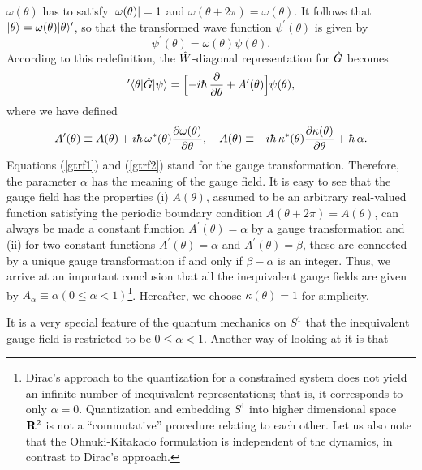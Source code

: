 \documentclass[a4paper,12pt]{article}
\begin{document}
$\omega(\theta)$ has to satisfy ${\left|{\omega(\theta)}\right|}=1$ 
and $\omega(\theta+2\pi)=\omega(\theta)$. It follows that    
$|{\theta}\rangle=\omega(\theta)|{\theta}\rangle^{\prime}$, so that the transformed
wave function $\psi^{\prime}(\theta)$ is given by
\begin{equation}
\psi^{\prime}(\theta)=\omega(\theta)\psi(\theta).
\label{gtrf1}
\end{equation} 
According to this redefinition, the $\hat W$-diagonal representation for $\hat G$
becomes
\begin{equation} 
'\bra{\theta}{\hg}\ket{\psi}=
\Bigl[-i\hbar~{\del\over{\del\theta}}+A^{\prime}(\theta)\Bigr]
\psi(\theta),
\label{newrepreg}
\end{equation} 
where we have defined 
\begin{equation}
A^{\prime}(\theta) \equiv A(\theta)+i\hbar~\omega^*(\theta)
{{\del\omega(\theta)}\over{\del\theta}}, \quad
A(\theta)\equiv -i\hbar~\kappa^*({\theta})
{{\del\kappa(\theta)}\over{\del\theta}}+\hbar~\alpha.
\label{gtrf2}
\end{equation}
Equations (\ref{gtrf1}) and (\ref{gtrf2}) stand for the gauge transformation.
Therefore, the parameter $\alpha$ has the meaning of the gauge field.
It is easy to see that the gauge field has 
the properties (i) $A(\theta)$, assumed to be   
an arbitrary real-valued function satisfying the periodic boundary condition 
$A(\theta+2\pi)=A(\theta)$, can always be made a constant 
function $A^{\prime}(\theta)=\alpha$ by a gauge transformation and (ii) for 
two constant functions $A^{\prime}(\theta)=\alpha$ 
and $A^{\prime}(\theta)=\beta$, these are 
connected by a unique gauge transformation if and only if $\beta-\alpha$ is
an integer. Thus, we arrive at an important conclusion that 
all the inequivalent gauge fields are given by 
$A_{\alpha}\equiv \alpha (0\leq \alpha < 1)$\footnote{
Dirac's approach to the quantization for a constrained system does not
yield an infinite number of inequivalent representations; that is, it 
corresponds to only $\alpha=0$. Quantization and 
embedding $S^1$ into higher dimensional space ${\bf R}^2$ is 
not a ``commutative'' procedure relating to each other. Let us also note that 
the Ohnuki-Kitakado formulation is independent of the dynamics, in contrast to 
Dirac's approach.}.
Hereafter, we choose $\kappa(\theta)=1$ for simplicity.
\par
It is a very special feature of the quantum mechanics on $S^1$ that the 
inequivalent gauge field is restricted to be $0\leq \alpha <1$. 
Another way of looking at it is that
\end{document}
